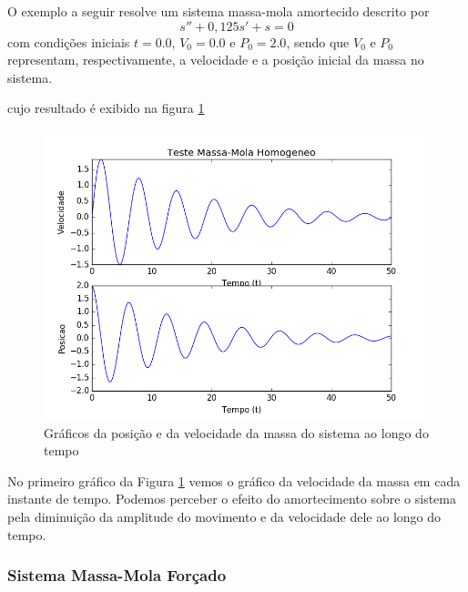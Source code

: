             O exemplo a seguir resolve um sistema massa-mola amortecido descrito por 
            \begin{equation*}
                s'' + 0,125s' + s = 0
            \end{equation*}
            com condições iniciais $t = 0.0$, $V_0 = 0.0$ e $P_0 = 2.0$, sendo que $V_0$ e $P_0$ representam, respectivamente, a velocidade e a posição inicial da massa no sistema.
            
            cujo resultado é exibido na figura \ref{fig:MMamortecido}
            \begin{figure}[H]
                \centering
                \includegraphics[scale=.54]{imagens/testeMassaMola.png}
                \caption{Gráficos da posição e da velocidade da massa do sistema ao longo do tempo}
                \label{fig:MMamortecido}
            \end{figure}
            
            No primeiro gráfico da Figura \ref{fig:MMamortecido} vemos o gráfico da velocidade da massa em cada instante de tempo.
            Podemos perceber o efeito do amortecimento sobre o sistema pela diminuição da amplitude do movimento e da velocidade dele ao longo do tempo.
            
            \subsubsection{Sistema Massa-Mola Forçado}
    
